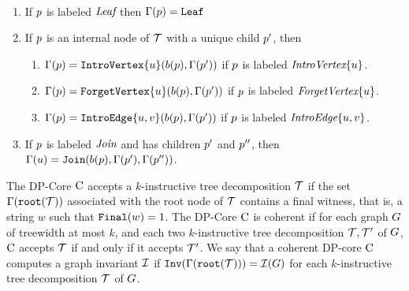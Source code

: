\begin{definition}[Dynamization]\label{Dynamization}
$ $
\begin{enumerate}
\item If $p$ is labeled $\texttt{\it{Leaf}}$ then $\Gamma(p) = \texttt{Leaf}$%
\item If $p$ is an internal node of $\mathcal{T}$ with a unique child $p'$, then 
\begin{enumerate}
    \item $\Gamma(p) = \texttt{IntroVertex}\{u\}(b(p),\Gamma(p'))$ if $p$ is labeled $\texttt{\it{IntroVertex}}\{u\}$. 
    \item $\Gamma(p) = \texttt{ForgetVertex}\{u\}(b(p),\Gamma(p'))$ if $p$ is labeled $\texttt{\it{ForgetVertex}}\{u\}$.
    \item $\Gamma(p) = \texttt{IntroEdge}\{u,v\}(b(p),\Gamma(p'))$ if $p$ is labeled $\texttt{\it{IntroEdge}}\{u,v\}$. 
\end{enumerate}
\item If $p$ is labeled $\texttt{\it{Join}}$ and has children $p'$ and $p''$, then $\Gamma(u) = \texttt{Join}(b(p),\Gamma(p'),\Gamma(p''))$. 
\end{enumerate}
\end{definition}

The DP-Core $\mathrm{C}$ accepts a $k$-instructive tree decomposition  $\mathcal{T}$ if the set 
$\Gamma(\texttt{root}(\mathcal{T}))$ associated with the root node of $\mathcal{T}$ contains a final witness, 
that is, a string $w$ such that $\texttt{Final}(w)=1$. The DP-Core $\mathrm{C}$ is coherent if for 
each graph $G$ of treewidth at most $k$, and each two $k$-instructive tree 
decomposition $\mathcal{T},\mathcal{T}'$ of $G$, $\mathrm{C}$ accepts $\mathcal{T}$ if and only if 
it accepts $\mathcal{T}'$. We say that a coherent DP-core $\mathrm{C}$ computes a graph invariant 
$\mathcal{I}$ if $\texttt{Inv}(\Gamma(\texttt{root}(\mathcal{T}))) = \mathcal{I}(G)$ for each $k$-instructive tree decomposition $\mathcal{T}$ of $G$. 




